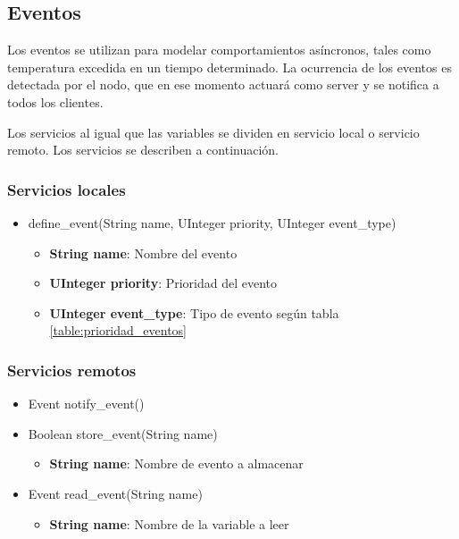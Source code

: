 \subsection{Eventos}
Los eventos se utilizan para modelar comportamientos asíncronos, tales como temperatura excedida en un tiempo determinado. La ocurrencia de los eventos es detectada por el nodo, que en ese momento actuará como server y se notifica a todos los clientes.

Los servicios al igual que las variables se dividen en servicio local o servicio remoto. Los servicios se describen a continuación.

\subsubsection{Servicios locales}
\begin{itemize}
\item define\_event(String name, UInteger priority, UInteger event\_type)
  \begin{itemize}
  \item \textbf{String name}: Nombre del evento
  \item \textbf{UInteger priority}: Prioridad del evento
  \item \textbf{UInteger event\_type}: Tipo de evento según tabla \ref{table:prioridad_eventos}
  \end{itemize}

\end{itemize}

\subsubsection{Servicios remotos}

\begin{itemize}
\item Event notify\_event()
\item Boolean store\_event(String name)
  \begin{itemize}
    \item \textbf{String name}: Nombre de evento a almacenar
  \end{itemize}
  
\item Event read\_event(String name)
  \begin{itemize}
    \item \textbf{String name}: Nombre de la variable a leer
  \end{itemize}
\end{itemize}

